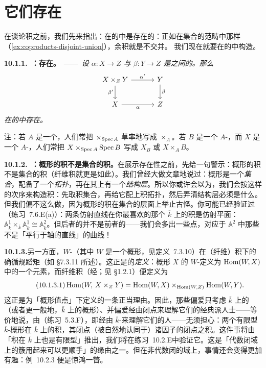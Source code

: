 
\section{它们存在}

在谈论积之前，我们先来指出：\trCoproduct{}在\trScheme{}的\trCategory{}中是存在的：正如在集合的范畴中那样（\cref{ex:coproducts-disjoint-union}），余积就是不交并。
我们现在就要在\trScheme{}的\trCategory{}中构造\trFiberProduct。

\textbf{10.1.1.\ \trhTheorem{}：\trFiberProduct{}存在。}\ ——\ \emph{设 $\alpha\colon X\to Z$ 与 $\beta\colon Y\to Z$ 是\trScheme{}之间的\trMorphism。那么\trFiberProduct}
\[
\begin{tikzcd}[row sep=1.9em, column sep=3.2em]
X\times_Z Y \ar[r, "\alpha'"] \ar[d, "\beta'"'] & Y \ar[d, "\beta"] \\
X \ar[r, "\alpha"'] & Z
\end{tikzcd}
\]
\emph{在\trScheme{}的\trCategory{}中存在。}

注：若 $A$ 是一个\trRing，人们常把 $\times_{\operatorname{Spec} A}$ 草率地写成 $\times_A$。若 $B$ 是一个 $A$-\trAlgebra，而 $X$ 是一个 $A$-\trScheme，人们常把 $X\times_{\operatorname{Spec} A}\operatorname{Spec} B$ 写成 $X_B$ 或 $X\times_A B$。

\textbf{10.1.2.\ \trhWarning{}：概形的积不是集合的积。}\quad 在展示存在性之前，先给一句警示：概形的积不是集合的积（纤维积就更是如此）。我们曾经大做文章地说过：概形是一个\emph{集合}，配备了一个\emph{拓扑}，再在其上有一个\emph{结构层}。所以你或许会以为，我们会按这样的次序来构造积：先取积集合，再给它配上积拓扑，然后弄清结构层必须是什么。但我们偏不这么做，因为概形的积在集合的层面上举止古怪。你可能已经验证过（\mbox{练习~7.6.E}(a)）：两条仿射直线在你最喜欢的那个\trAlgClosedField{} $\overline{k}$ 上的积是仿射平面：$\mathbb{A}^1_{\overline{k}}\times_{\overline{k}}\mathbb{A}^1_{\overline{k}}\cong\mathbb{A}^2_{\overline{k}}$。但后者的\trUnderlyingSet{}并不是前者的\trUnderlyingSet{}——我们会多出一些点，对应于 $\mathbb{A}^2$ 中那些不是「平行于轴的直线」的曲线！

\textbf{10.1.3.}\quad 另一方面，$W$-\trValuedPoint{}（其中 $W$ 是一个概形，见定义~7.3.10）在（纤维）积下的确循规蹈矩（如 \S7.3.11 所述）。这正是\trFiberProduct{}的\emph{\trUniversalProperty{}定义}：概形 $X$ 的 $W$-\trValuedPoint{}定义为 $\operatorname{Hom}(W,X)$ 中的一个元素，而纤维积（经\trYonedaLemma；见 \S1.2.1）便定义为
\begin{equation*}\tag{10.1.3.1}\label{eq:valued-points-fiber-product}
\operatorname{Hom}(W,\,X\times_Z Y)=\operatorname{Hom}(W,X)\times_{\operatorname{Hom}(W,Z)}\operatorname{Hom}(W,Y).
\end{equation*}
这正是为「概形值点」下定义的一条正当理由。因此，那些偏爱只考虑\trAlgClosedField{} $\overline{k}$ 上的\trVariety（或者更一般地，$\overline{k}$ 上的\trFiniteType{}概形）、并偏爱经由闭点来理解它们的经典派人士——等价地说，由\trNullstellensatz（\mbox{练习~5.3.F}），即经由 $\overline{k}$-\trValuedPoint{}来理解它们的人——无须担心：两个有限型 $\overline{k}$-概形在 $\overline{k}$ 上的积，其闭点（被自然地认同于）诸因子的闭点之积。这件事将由「积在 $\overline{k}$ 上也是有限型」推出，我们将在\mbox{练习~10.2.E}中验证它。这是「代数闭域上的簇用起来可以更顺手」的缘由之一。但在非代数闭的域上，事情还会变得更加有趣：例~10.2.3 便是惊鸿一瞥。

